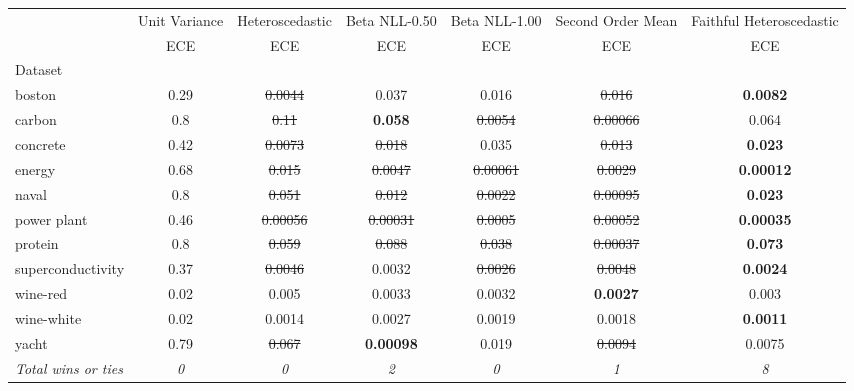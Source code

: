 \begin{tabular}{l|c|c|c|c|c|c}
\toprule
{} & {Unit Variance} & {Heteroscedastic} & {Beta NLL-0.50} & {Beta NLL-1.00} & {Second Order Mean} & {Faithful Heteroscedastic} \\
{} & {ECE} & {ECE} & {ECE} & {ECE} & {ECE} & {ECE} \\
{Dataset} & {} & {} & {} & {} & {} & {} \\
\midrule
boston & 0.29 & \sout{0.0044} & 0.037 & 0.016 & \sout{0.016} & \textbf{0.0082} \\
carbon & 0.8 & \sout{0.11} & \textbf{0.058} & \sout{0.0054} & \sout{0.00066} & 0.064 \\
concrete & 0.42 & \sout{0.0073} & \sout{0.018} & 0.035 & \sout{0.013} & \textbf{0.023} \\
energy & 0.68 & \sout{0.015} & \sout{0.0047} & \sout{0.00061} & \sout{0.0029} & \textbf{0.00012} \\
naval & 0.8 & \sout{0.051} & \sout{0.012} & \sout{0.0022} & \sout{0.00095} & \textbf{0.023} \\
power plant & 0.46 & \sout{0.00056} & \sout{0.00031} & \sout{0.0005} & \sout{0.00052} & \textbf{0.00035} \\
protein & 0.8 & \sout{0.059} & \sout{0.088} & \sout{0.038} & \sout{0.00037} & \textbf{0.073} \\
superconductivity & 0.37 & \sout{0.0046} & 0.0032 & \sout{0.0026} & \sout{0.0048} & \textbf{0.0024} \\
wine-red & 0.02 & 0.005 & 0.0033 & 0.0032 & \textbf{0.0027} & 0.003 \\
wine-white & 0.02 & 0.0014 & 0.0027 & 0.0019 & 0.0018 & \textbf{0.0011} \\
yacht & 0.79 & \sout{0.067} & \textbf{0.00098} & 0.019 & \sout{0.0094} & 0.0075 \\
\textit{{Total wins or ties}} & \textit{0} & \textit{0} & \textit{2} & \textit{0} & \textit{1} & \textit{8} \\
\bottomrule
\end{tabular}

